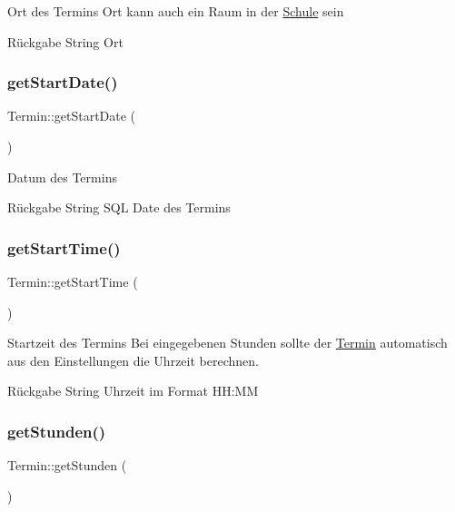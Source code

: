 Ort des Termins Ort kann auch ein Raum in der \mbox{\hyperlink{class_schule}{Schule}} sein \begin{DoxyReturn}{Rückgabe}
String Ort 
\end{DoxyReturn}
\mbox{\label{interface_termin_a9ed1a03f1247bfa10a8e56f5fd8634cd}} 
\subsubsection{\texorpdfstring{get\+Start\+Date()}{getStartDate()}}
{\footnotesize\ttfamily Termin\+::get\+Start\+Date (\begin{DoxyParamCaption}{ }\end{DoxyParamCaption})}

Datum des Termins \begin{DoxyReturn}{Rückgabe}
String S\+QL Date des Termins 
\end{DoxyReturn}
\mbox{\label{interface_termin_a6421df2bc4f4e75c3b451e71ce104780}} 
\subsubsection{\texorpdfstring{get\+Start\+Time()}{getStartTime()}}
{\footnotesize\ttfamily Termin\+::get\+Start\+Time (\begin{DoxyParamCaption}{ }\end{DoxyParamCaption})}

Startzeit des Termins Bei eingegebenen Stunden sollte der \mbox{\hyperlink{interface_termin}{Termin}} automatisch aus den Einstellungen die Uhrzeit berechnen. \begin{DoxyReturn}{Rückgabe}
String Uhrzeit im Format HH\+:MM 
\end{DoxyReturn}
\mbox{\label{interface_termin_a50c2f45c4958f1bb77c1606d5f7a0323}} 
\subsubsection{\texorpdfstring{get\+Stunden()}{getStunden()}}
{\footnotesize\ttfamily Termin\+::get\+Stunden (\begin{DoxyParamCaption}{ }\end{DoxyParamCaption})}

